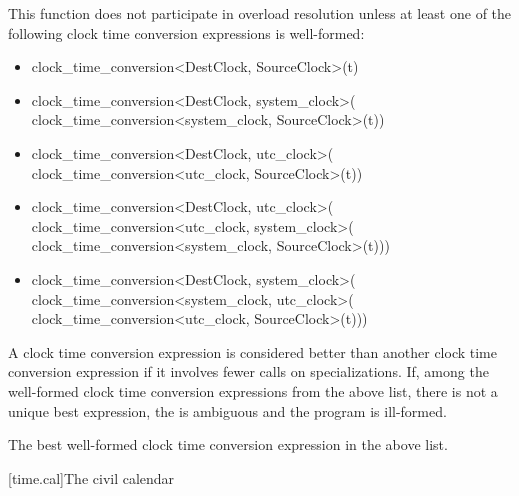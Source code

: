 \begin{itemdescr}
\pnum
\remarks
This function does not participate in overload resolution unless
at least one of the following clock time conversion expressions
is well-formed:

\begin{itemize}
\item
\begin{codeblock}
clock_time_conversion<DestClock, SourceClock>{}(t)
\end{codeblock}

\item
\begin{codeblock}
clock_time_conversion<DestClock, system_clock>{}(
    clock_time_conversion<system_clock, SourceClock>{}(t))
\end{codeblock}

\item
\begin{codeblock}
clock_time_conversion<DestClock, utc_clock>{}(
    clock_time_conversion<utc_clock, SourceClock>{}(t))
\end{codeblock}

\item
\begin{codeblock}
clock_time_conversion<DestClock, utc_clock>{}(
    clock_time_conversion<utc_clock, system_clock>{}(
        clock_time_conversion<system_clock, SourceClock>{}(t)))
\end{codeblock}

\item
\begin{codeblock}
clock_time_conversion<DestClock, system_clock>{}(
    clock_time_conversion<system_clock, utc_clock>{}(
        clock_time_conversion<utc_clock, SourceClock>{}(t)))
\end{codeblock}
\end{itemize}

A clock time conversion expression is considered better than
another clock time conversion expression if it involves fewer
 calls on 
specializations.
If, among the well-formed clock time conversion expressions
from the above list, there is not a unique best expression,
the  is ambiguous and the program is ill-formed.

\pnum
\returns
The best well-formed clock time conversion expression in the above list.
\end{itemdescr}

[time.cal]{The civil calendar}

